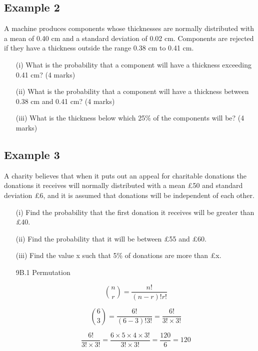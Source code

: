 \documentclass[12pt]{report}
\begin{document}
\subsection{Example 2}
A machine produces components whose thicknesses are normally
distributed with a mean of 0.40 cm and a standard deviation of 0.02 cm.
Components are rejected if they have a thickness outside the range 0.38 cm
to 0.41 cm.
\begin{itemize}
\item[(i)] What is the probability that a component will have a thickness
exceeding 0.41 cm? (4 marks)
\item[(ii)] What is the probability that a component will have a thickness between
0.38 cm and 0.41 cm? (4 marks)
\item[(iii)] What is the thickness below which 25\% of the components will be? (4 marks)
\end{itemize}
\subsection{Example 3}
A charity believes that when it puts out an appeal for charitable donations the
donations it receives will normally distributed with a mean £50 and standard
deviation £6, and it is assumed that donations will be independent of each
other.
\begin{itemize}
	\item[(i)] Find the probability that the first donation it receives will be greater
	than £40.
	\item[(ii)] Find the probability that it will be between £55 and £60.
	\item[(iii)] Find the value x such that 5\% of donations are more than £x.
\end{itemize}


\begin{itemize}
	\item[9B.1] Permutation
	
	\[ {n \choose r} = \frac{n!}{(n-r)! r!} \]
	
	
	\[ {6 \choose 3} = \frac{6!}{(6-3)! 3!} = \frac{6!}{3! \times 3!}\]
	
	
	\[ \frac{6!}{3! \times 3!} = \frac{6 \times 5 \times 4 \times 3!}{3! \times 3!} = \frac{120}{6} = 120\]
\end{itemize}
\end{document}
